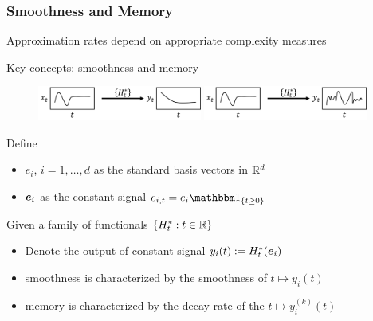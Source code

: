 \begin{frame}
    \frametitle{Smoothness and Memory}

	Approximation rates depend on appropriate complexity measures

    \pause{}

    Key concepts: \alert{smoothness} and \alert{memory}

    \begin{figure}
        \includegraphics[width=0.48\textwidth]{figures/easy_approx.png}
        \includegraphics[width=0.48\textwidth]{figures/hard_approx.png}
    \end{figure}

    \pause{}

    Define
    \begin{itemize}
        \item $e_i$, $i=1,\dots,d$ as the standard basis vectors in $\mathbb{R}^d$
        \item $\boldsymbol{e}_i$ as the constant signal $e_{i,t} = e_i \ind_{\{t\geq 0\}}$
    \end{itemize}

    \pause{}

    Given a family of functionals $\{H^*_t : t\in\mathbb{R}\}$
    \begin{itemize}
        \item Denote the output of constant signal $y_i(t) := H^*_t(\boldsymbol{e}_i)$
        \item \alert{smoothness} is characterized by the smoothness of $t\mapsto y_i(t)$
        \item \alert{memory} is characterized by the decay rate of the $t\mapsto y_i^{(k)}(t)$
    \end{itemize}
\end{frame}


